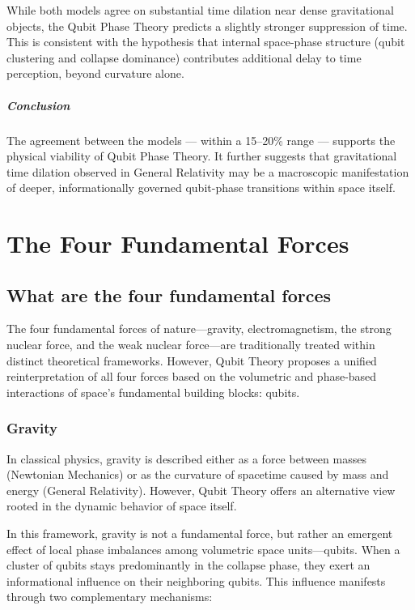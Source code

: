 \documentclass[12pt]{report} %
\begin{document}
While both models agree on substantial time dilation near dense gravitational objects, the Qubit Phase Theory predicts a slightly stronger suppression of time. This is consistent with the hypothesis that internal space-phase structure (qubit clustering and collapse dominance) contributes additional delay to time perception, beyond curvature alone.

\paragraph{Conclusion}

The agreement between the models — within a 15–20\% range — supports the physical viability of Qubit Phase Theory. It further suggests that gravitational time dilation observed in General Relativity may be a macroscopic manifestation of deeper, informationally governed qubit-phase transitions within space itself.




\newpage
\chapter{The Four Fundamental Forces}
\section{What are the four fundamental forces}
The four fundamental forces of nature—gravity, electromagnetism, the strong nuclear force, and the weak nuclear force—are traditionally treated within distinct theoretical frameworks. However, Qubit Theory proposes a unified reinterpretation of all four forces based on the volumetric and phase-based interactions of space’s fundamental building blocks: qubits.

\subsection{Gravity}

In classical physics, gravity is described either as a force between masses (Newtonian Mechanics) or as the curvature of spacetime caused by mass and energy (General Relativity). However, Qubit Theory offers an alternative view rooted in the dynamic behavior of space itself.

In this framework, gravity is not a fundamental force, but rather an emergent effect of local phase imbalances among volumetric space units—qubits. When a cluster of qubits stays predominantly in the collapse phase, they exert an informational influence on their neighboring qubits. This influence manifests through two complementary mechanisms:
\end{document}
